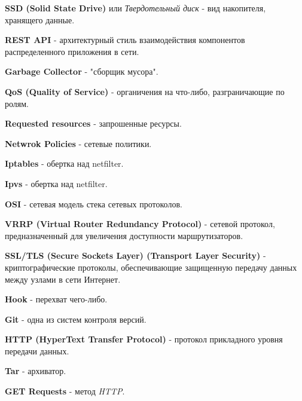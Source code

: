 \textbf{SSD (Solid State Drive)} или \textit{Твердотельный диск} - вид накопителя, хранящего данные.

\textbf{REST API} - архитектурный стиль взаимодействия компонентов распределенного приложения в сети.

\textbf{Garbage Collector} - "сборщик мусора".

\textbf{QoS (Quality of Service)} - органичения на что-либо, разграничающие по ролям.

\textbf{Requested resources} - запрошенные ресурсы.

\textbf{Netwrok Policies} - сетевые политики.

\textbf{Iptables} - обертка над netfilter.

\textbf{Ipvs} - обертка над netfilter.

\textbf{OSI} - сетевая модель стека сетевых протоколов.

\textbf{VRRP (Virtual Router Redundancy Protocol)} - сетевой протокол, предназначенный для увеличения доступности маршрутизаторов.

\textbf{SSL/TLS (Secure Sockets Layer) (Transport Layer Security)} - криптографические протоколы, обеспечивающие защищенную передачу данных между узлами в сети Интернет.

\textbf{Hook} - перехват чего-либо.

\textbf{Git} - одна из систем контроля версий.

\textbf{HTTP (HyperText Transfer Protocol)} - протокол прикладного уровня передачи данных.

\textbf{Tar} - архиватор.

\textbf{GET Requests} - метод \textit{HTTP}.

